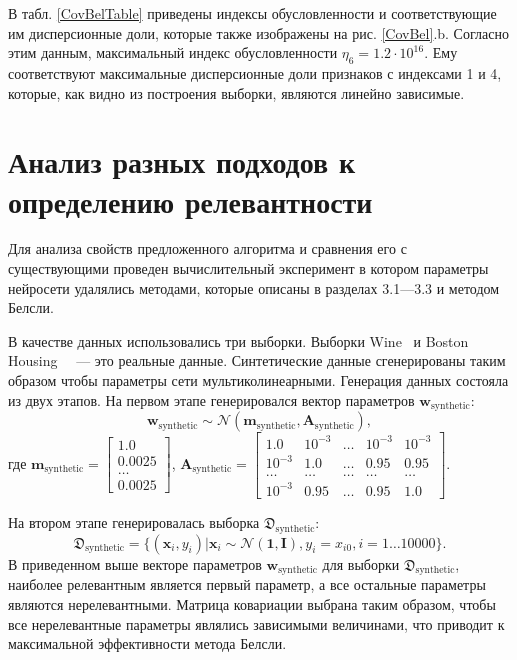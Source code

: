 В табл. \ref{CovBelTable} приведены индексы обусловленности и соответствующие им дисперсионные доли, которые также изображены на рис. \ref{CovBel}.b. Согласно этим данным, максимальный индекс обусловленности $\eta_6 = 1.2\cdot 10^{16}$. Ему соответствуют максимальные дисперсионные доли признаков с индексами 1 и 4, которые, как видно из построения выборки, являются линейно зависимые.

\section{Анализ разных подходов к определению релевантности}
Для анализа свойств предложенного алгоритма и сравнения его с существующими проведен вычислительный эксперимент в котором параметры нейросети удалялись методами, которые описаны в разделах 3.1---3.3 и методом Белсли.

В качестве данных использовались три выборки. Выборки Wine~\cite{Wine} и Boston Housing~\cite{Boston} ~--- это реальные данные. Синтетические данные сгенерированы таким образом чтобы параметры сети мультиколинеарными. Генерация данных состояла из двух этапов. 
На первом этапе генерировался вектор параметров $\mathbf{w}_{\text{synthetic}}$:
\[
\mathbf{w}_{\text{synthetic}}  \sim \mathcal{N}(\textbf{m}_{\text{synthetic}}, \textbf{A}_{\text{synthetic}}),
\]
где 
$\textbf{m}_{\text{synthetic}} = \begin{bmatrix}
1.0\\
0.0025\\
\ldots\\
0.0025
\end{bmatrix}$,
$\textbf{A}_{\text{synthetic}} = \begin{bmatrix}
1.0& 10^{-3}& \ldots& 10^{-3}& 10^{-3}\\
10^{-3}& 1.0& \ldots& 0.95& 0.95\\
\ldots&\ldots&\ldots&\ldots&\ldots\\
10^{-3}& 0.95& \ldots& 0.95& 1.0
\end{bmatrix}$.

На втором этапе генерировалась выборка $\mathfrak{D}_{\text{synthetic}}$:
\[
\mathfrak{D}_{\text{synthetic}} = \{(\textbf{x}_i,y_i)| \textbf{x}_i \sim  \mathcal{N}(\textbf{1}, \textbf{I}), y_i = x_{i0}, i = 1 \ldots 10000\}.
\]
В приведенном выше векторе параметров $\mathbf{w}_{\text{synthetic}}$ для выборки $\mathfrak{D}_{\text{synthetic}}$, наиболее релевантным является первый параметр, а все остальные параметры являются нерелевантными. Матрица ковариации выбрана таким образом, чтобы все нерелевантные параметры являлись зависимыми величинами, что приводит к максимальной эффективности метода Белсли.

